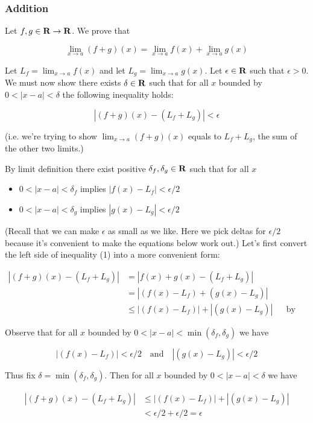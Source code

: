 \subsubsection*{Addition}

Let $f,g\in\mathbf{R}\to\mathbf{R}$. We prove that

\[\lim_{x\to a}(f+g)(x)=\lim_{x\to a}f(x)+\lim_{x\to a}g(x)\]

Let $L_f=\lim_{x\to a}f(x)$ and let $L_g=\lim_{x\to a}g(x)$. Let
$\epsilon\in\mathbf{R}$ such that $\epsilon>0$. We must now show there exists
$\delta\in\mathbf{R}$ such that for all $x$ bounded by $0<|x-a|<\delta$ the following
inequality holds:

\begin{equation}
|(f+g)(x)-(L_f+L_g)|<\epsilon    
\end{equation}

(i.e. we're trying to show $\lim_{x\to a}(f+g)(x)$ equals to $L_f+L_g$, the sum of the other two limits.)

\vs

By limit definition there exist positive $\delta_f, \delta_g\in\mathbf{R}$ such that for all $x$

\begin{itemize}
    \item $0<|x-a|<\delta_f$ implies $|f(x)-L_f|<\epsilon/2$
    \item $0<|x-a|<\delta_g$ implies $|g(x)-L_g|<\epsilon/2$
\end{itemize}

(Recall that we can make $\epsilon$ as small as we like. Here we pick deltas
for $\epsilon/2$ because it's convenient to make the equations below work
out.) Let's first convert the left side of inequality (1) into a more
convenient form:

\begin{align*}
    |(f+g)(x)-(L_f+L_g)|&=|f(x)+g(x)-(L_f+L_g)|\\
    &=|(f(x)-L_f)+(g(x)-L_g)|\\
    &\leq |(f(x)-L_f)|+|(g(x)-L_g)|&&\text{by triangle inequality}
\end{align*}

Observe that for all $x$ bounded by $0<|x-a|<\min(\delta_f, \delta_g)$ we have

\[|(f(x)-L_f)|<\epsilon/2 \ \ \ \text{ and }\ \ \  |(g(x)-L_g)|<\epsilon/2\]

Thus fix $\delta=\min(\delta_f, \delta_g)$. Then for all $x$ bounded by
$0<|x-a|<\delta$ we have

\begin{align*}
    |(f+g)(x)-(L_f+L_g)|&\leq |(f(x)-L_f)|+|(g(x)-L_g)|\\
    &<\epsilon/2+\epsilon/2=\epsilon
\end{align*}

